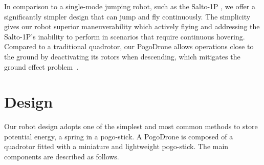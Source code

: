 \documentclass[letterpaper,10pt,conference]{ieeeconf}
\newcommand{\david}[1]{{\color{blue}#1}}
\newcommand{\andrew}[1]{{\color{green}#1}}
\begin{document}
In comparison to a single-mode jumping robot, such as the Salto-1P \cite{haldane2017repetitive}, we offer a significantly simpler design that can jump and fly continuously. The simplicity gives our robot superior maneuverability which actively flying and addressing the Salto-1P's inability to perform in scenarios that require continuous hovering. Compared to a traditional quadrotor, our PogoDrone allows operations close to the ground by deactivating its rotors when descending, which mitigates the ground effect problem~\cite{kushleyev2013towards}.







\section{Design}
\label{sec:Design}
\noindent 
Our robot design adopts one of the simplest and most common methods to store potential energy, a spring in a pogo-stick.
A PogoDrone is composed of a quadrotor fitted with a miniature and lightweight pogo-stick. The main components are described as follows.
\end{document}
